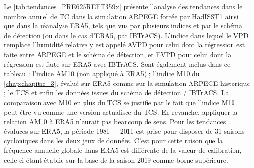 \documentclass[../main.tex]{subfiles}
\begin{document}
Le \cref{tab:tendances_PRE625REFT359x} présente l'analyse des tendances dans le nombre annuel de TC dans la simulation ARPEGE forcée par HadISST1 ainsi que dans
la réanalyse ERA5, tels que vus par plusieurs indices et par le schéma de détection (ou dans le cas d'ERA5, par IBTrACS). L'indice dans lequel le VPD remplace
l'humidité relative y est appelé AVPD pour celui dont la régression est faite entre ARPEGE et le schéma de détection, et EVPD pour celui dont la régression est
faite sur ERA5 avec IBTrACS. Sont également inclus dans ce tableau : l'indice AM10 (non appliqué à ERA5) ; l'indice M10 du \cref{chap:chapitre_3}, évalué sur
ERA5 comme sur la simulation ARPEGE historique ; le TCS et enfin les données issues du schéma de détection / IBTrACS. La comparaison avec M10 en plus du TCS se
justifie par le fait que l'indice M10 peut être vu comme une version actualisée du TCS. En revanche, appliquer la relation AM10 à ERA5 n'aurait pas beaucoup de
sens. Pour les tendances évaluées sur ERA5, la période \num{1981}~--~\num{2011} est prise pour disposer de \num{31} saisons cycloniques dans les deux jeux de
données. C'est pour cette raison que la fréquence annuelle globale dans ERA5 est différente de la valeur de calibration, celle-ci étant établie sur la base de
la saison 2019 comme borne supérieure.
\end{document}
